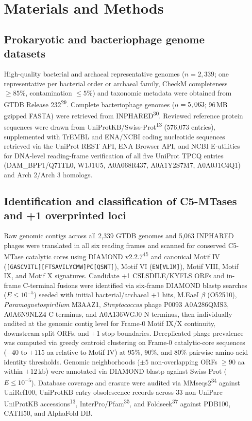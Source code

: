 \documentclass[10pt,letterpaper]{article}
\newcommand{\spname}[1]{\textit{#1}}
\newcommand{\refsup}[1]{\textsuperscript{#1}}
\begin{document}
\section{Materials and Methods}

\subsection{Prokaryotic and bacteriophage genome datasets}

High-quality bacterial and archaeal representative genomes ($n = 2,339$; one representative per bacterial order or archaeal family, CheckM completeness $\ge 85\%$, contamination $\le 5\%$) and taxonomic metadata were obtained from GTDB Release 232\refsup{29}. Complete bacteriophage genomes ($n = 5,063$; 96\,MB gzipped FASTA) were retrieved from INPHARED\refsup{30}. Reviewed reference protein sequences were drawn from UniProtKB/Swiss-Prot\refsup{13} (576,073 entries), supplemented with TrEMBL and ENA/NCBI coding nucleotide sequences retrieved via the UniProt REST API, ENA Browser API, and NCBI E-utilities for DNA-level reading-frame verification of all five UniProt TPCQ entries (DAM\_BPP1/Q71TL0, W1J1U5, A0A068R437, A0A1Y2S7M7, A0A0J1C4Q1) and Arch 2/Arch 3 homologs.

\subsection{Identification and classification of C5-MTases and +1 overprinted loci}

Raw genomic contigs across all 2,339 GTDB genomes and 5,063 INPHARED phages were translated in all six reading frames and scanned for conserved C5-MTase catalytic cores using DIAMOND v2.2.7\refsup{45} and canonical Motif IV (\texttt{[GASCVITL][FTSAVILYCMW]PC[QSNT]}), Motif VI (\texttt{EN[VLIM]}), Motif VIII, Motif IX, and Motif X signatures. Candidate +1 CSLSDILE/KYFLS ORFs and in-frame C-terminal fusions were identified via six-frame DIAMOND blastp searches ($E \le 10^{-5}$) seeded with initial bacterial/archaeal +1 hits, M.EaeI $\beta$ (O52510), \spname{Paramagnetospirillum} M3AAZ1, \spname{Streptococcus} phage P0093 A0A286QMS3, A0A6N9NLZ4 C-terminus, and A0A136WGJ0 N-terminus, then individually audited at the genomic contig level for Frame-0 Motif IX/X continuity, downstream split ORFs, and +1 stop boundaries. Dereplicated phage prevalence was computed via greedy centroid clustering on Frame-0 catalytic-core sequences ($-40$ to $+115$ aa relative to Motif IV) at 95\%, 90\%, and 80\% pairwise amino-acid identity thresholds. Genomic neighborhoods ($\pm 5$ non-overlapping ORFs $\ge 90$ aa within $\pm 12$\,kb) were annotated via DIAMOND blastp against Swiss-Prot ($E \le 10^{-5}$). Database coverage and erasure were audited via MMseqs2\refsup{34} against UniRef100, UniProtKB entry obsolescence records across 33 non-UniParc UniProtKB accessions\refsup{13}, InterPro/Pfam\refsup{35}, and Foldseek\refsup{37} against PDB100, CATH50, and AlphaFold DB.
\end{document}
